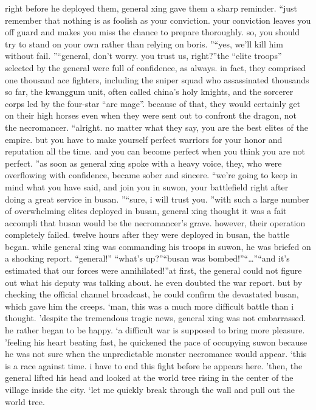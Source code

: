 right before he deployed them, general xing gave them a sharp reminder.
“just remember that nothing is as foolish as your conviction.
 your conviction leaves you off guard and makes you miss the chance to prepare thoroughly.
 so, you should try to stand on your own rather than relying on boris.
”“yes, we’ll kill him without fail.
”“general, don’t worry.
 you trust us, right?”the “elite troops” selected by the general were full of confidence, as always.
 in fact, they comprised one thousand ace fighters, including the sniper squad who assassinated thousands so far, the kwanggum unit, often called china’s holy knights, and the sorcerer corps led by the four-star “arc mage”.
because of that, they would certainly get on their high horses even when they were sent out to confront the dragon, not the necromancer.
“alright.
 no matter what they say, you are the best elites of the empire.
 but you have to make yourself perfect warriors for your honor and reputation all the time.
 and you can become perfect when you think you are not perfect.
”as soon as general xing spoke with a heavy voice, they, who were overflowing with confidence, became sober and sincere.
“we’re going to keep in mind what you have said, and join you in suwon, your battlefield right after doing a great service in busan.
”“sure, i will trust you.
”with such a large number of overwhelming elites deployed in busan, general xing thought it was a fait accompli that busan would be the necromancer’s grave.
however, their operation completely failed.
twelve hours after they were deployed in busan, the battle began.
while general xing was commanding his troops in suwon, he was briefed on a shocking report.
“general!”
“what’s up?”“busan was bombed!”“…”“and it’s estimated that our forces were annihilated!”at first, the general could not figure out what his deputy was talking about.
 he even doubted the war report.
 but by checking the official channel broadcast, he could confirm the devastated busan, which gave him the creeps.
‘man, this was a much more difficult battle than i thought.
’despite the tremendous tragic news, general xing was not embarrassed.
 he rather began to be happy.
‘a difficult war is supposed to bring more pleasure.
’feeling his heart beating fast, he quickened the pace of occupying suwon because he was not sure when the unpredictable monster necromance would appear.
‘this is a race against time.
 i have to end this fight before he appears here.
’then, the general lifted his head and looked at the world tree rising in the center of the village inside the city.
‘let me quickly break through the wall and pull out the world tree.
